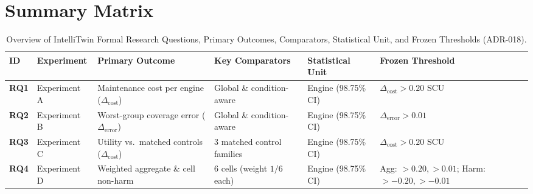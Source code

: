 \documentclass{article}
\begin{document}
\section*{Summary Matrix}

\begin{table}[h!]
\centering
\small
\begin{tabular}{p{0.8cm} p{2.0cm} p{3.2cm} p{3.2cm} p{2.2cm} p{2.4cm}}
\toprule
\textbf{ID} & \textbf{Experiment} & \textbf{Primary Outcome} & \textbf{Key Comparators} & \textbf{Statistical Unit} & \textbf{Frozen Threshold} \\
\midrule
\textbf{RQ1} & Experiment A & Maintenance cost per engine ($\Delta_{\text{cost}}$) & Global \& condition-aware & Engine (98.75\% CI) & $\Delta_{\text{cost}} > 0.20$ SCU \\
\textbf{RQ2} & Experiment B & Worst-group coverage error ($\Delta_{\text{error}}$) & Global \& condition-aware & Engine (98.75\% CI) & $\Delta_{\text{error}} > 0.01$ \\
\textbf{RQ3} & Experiment C & Utility vs.\ matched controls ($\Delta_{\text{cost}}$) & 3 matched control families & Engine (98.75\% CI) & $\Delta_{\text{cost}} > 0.20$ SCU \\
\textbf{RQ4} & Experiment D & Weighted aggregate \& cell non-harm & 6 cells (weight $1/6$ each) & Engine (98.75\% CI) & Agg: $>0.20, >0.01$; Harm: $>-0.20, >-0.01$ \\
\bottomrule
\end{tabular}
\caption{Overview of IntelliTwin Formal Research Questions, Primary Outcomes, Comparators, Statistical Unit, and Frozen Thresholds (ADR-018).}
\end{table}
\end{document}
